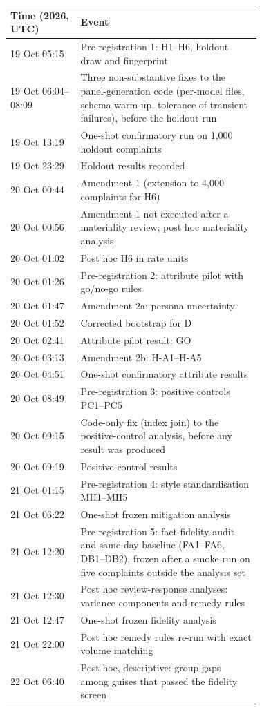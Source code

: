 \begin{center}\small\begin{tabular}{@{}lp{0.72\linewidth}@{}}\toprule
Time (2026, UTC) & Event \\
\midrule
19 Oct 05:15 & Pre-registration 1: H1--H6, holdout draw and fingerprint \\
19 Oct 06:04--08:09 & Three non-substantive fixes to the panel-generation code (per-model files, schema warm-up, tolerance of transient failures), before the holdout run \\
19 Oct 13:19 & One-shot confirmatory run on 1,000 holdout complaints \\
19 Oct 23:29 & Holdout results recorded \\
20 Oct 00:44 & Amendment 1 (extension to 4,000 complaints for H6) \\
20 Oct 00:56 & Amendment 1 not executed after a materiality review; post hoc materiality analysis \\
20 Oct 01:02 & Post hoc H6 in rate units \\
20 Oct 01:26 & Pre-registration 2: attribute pilot with go/no-go rules \\
20 Oct 01:47 & Amendment 2a: persona uncertainty \\
20 Oct 01:52 & Corrected bootstrap for D \\
20 Oct 02:41 & Attribute pilot result: GO \\
20 Oct 03:13 & Amendment 2b: H-A1--H-A5 \\
20 Oct 04:51 & One-shot confirmatory attribute results \\
20 Oct 08:49 & Pre-registration 3: positive controls PC1--PC5 \\
20 Oct 09:15 & Code-only fix (index join) to the positive-control analysis, before any result was produced \\
20 Oct 09:19 & Positive-control results \\
21 Oct 01:15 & Pre-registration 4: style standardisation MH1--MH5 \\
21 Oct 06:22 & One-shot frozen mitigation analysis \\
21 Oct 12:20 & Pre-registration 5: fact-fidelity audit and same-day baseline (FA1--FA6, DB1--DB2), frozen after a smoke run on five complaints outside the analysis set \\
21 Oct 12:30 & Post hoc review-response analyses: variance components and remedy rules \\
21 Oct 12:47 & One-shot frozen fidelity analysis \\
21 Oct 22:00 & Post hoc remedy rules re-run with exact volume matching \\
22 Oct 06:40 & Post hoc, descriptive: group gaps among guises that passed the fidelity screen \\
\bottomrule\end{tabular}\end{center}

